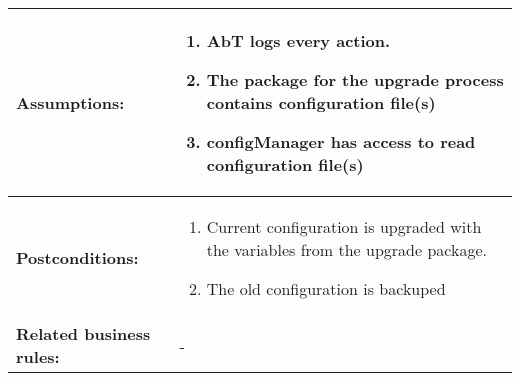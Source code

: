 \newpage
\begin{tabularx}{\linewidth}{|l|X|}
\hline
\textbf{Assumptions:} & \begin{enumerate} 
							\item AbT logs every action.
							\item The package for the upgrade process contains configuration file(s)
							\item configManager has access to read configuration file(s)
						\end{enumerate} \\
\hline
\textbf{Postconditions:} & 
  \begin{minipage}{\linewidth}
  \vspace{0.05em}
  \begin{enumerate}
    \item Current configuration is upgraded with the variables from the upgrade package.
	\item The old configuration is backuped
  \end{enumerate}
  \vspace{0.05em}
\end{minipage}
\\
\hline
\textbf{Related business rules:} & - \\
\hline
\end{tabularx}


